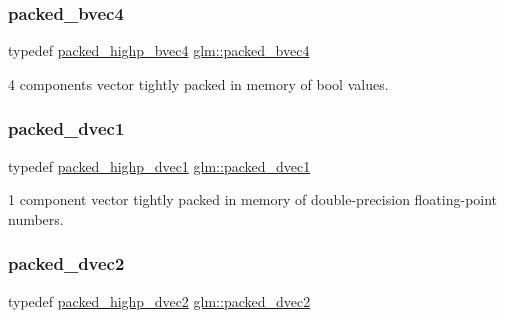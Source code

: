 \subsubsection{\texorpdfstring{packed\+\_\+bvec4}{packed\_bvec4}}
{\footnotesize\ttfamily typedef \mbox{\hyperlink{group__gtc__type__aligned_gaa7a006e26052e668a16bf3b8bd81cbef}{packed\+\_\+highp\+\_\+bvec4}} \mbox{\hyperlink{group__gtc__type__aligned_ga27837cfec1a5b6d6ae23961f93431403}{glm\+::packed\+\_\+bvec4}}}



4 components vector tightly packed in memory of bool values. 

\mbox{\label{group__gtc__type__aligned_ga1b85bcaa9f7caaec77f3a31d35669a98}} 
\subsubsection{\texorpdfstring{packed\+\_\+dvec1}{packed\_dvec1}}
{\footnotesize\ttfamily typedef \mbox{\hyperlink{group__gtc__type__aligned_ga28333ae58dc1ce6fdf75a8dba0065603}{packed\+\_\+highp\+\_\+dvec1}} \mbox{\hyperlink{group__gtc__type__aligned_ga1b85bcaa9f7caaec77f3a31d35669a98}{glm\+::packed\+\_\+dvec1}}}



1 component vector tightly packed in memory of double-\/precision floating-\/point numbers. 

\mbox{\label{group__gtc__type__aligned_ga88996e3df7350600759c8006ffcb7782}} 
\subsubsection{\texorpdfstring{packed\+\_\+dvec2}{packed\_dvec2}}
{\footnotesize\ttfamily typedef \mbox{\hyperlink{group__gtc__type__aligned_ga8c26414d99b8996aa7dc73e1dc8a06bd}{packed\+\_\+highp\+\_\+dvec2}} \mbox{\hyperlink{group__gtc__type__aligned_ga88996e3df7350600759c8006ffcb7782}{glm\+::packed\+\_\+dvec2}}}



